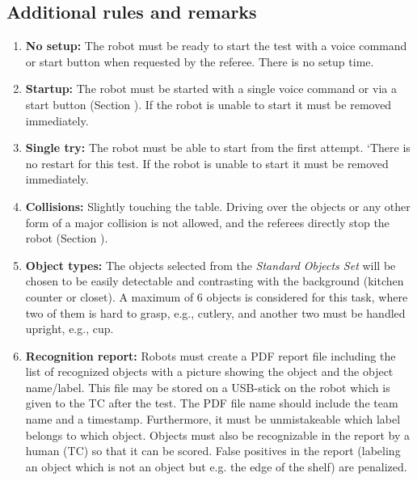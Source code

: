 \subsection{Additional rules and remarks}
\begin{enumerate}
\item \textbf{No setup:} The robot must be ready to start the test with a voice command or start button when requested by the referee. There is no setup time.
\item \textbf{Startup:} The robot must be started with a single voice command or via a start button (Section ). If the robot is unable to start it must be removed immediately.
\item \textbf{Single try:} The robot must be able to start from the first attempt. 
`There is no restart for this test. If the robot is unable to start it must be removed immediately.
\item \textbf{Collisions:} Slightly touching the table.
  Driving over the objects or any other form of a major collision is not allowed, and the referees directly stop the robot (Section ).
\item \textbf{Object types:} The objects selected from the \textit{Standard Objects Set} will be chosen to be easily detectable and contrasting with the background (kitchen counter or closet). A maximum of 6 objects is considered for this task, where two of them is hard to grasp, e.g., cutlery, and another two must be handled upright, e.g., cup.
\item \textbf{Recognition report:} Robots must create a PDF report file including the list of recognized objects with a picture showing the object and the object name/label.
  This file may be stored on a USB-stick on the robot which is given to the TC after the test. The PDF file name should include the team name and a timestamp. 
  Furthermore, it must be unmistakeable which label belongs to which object. Objects must also be recognizable in the report by a human (TC) so that it can be scored. 
False positives in the report (labeling an object which is not an object but e.g. the edge of the shelf) are penalized.

\end{enumerate}
